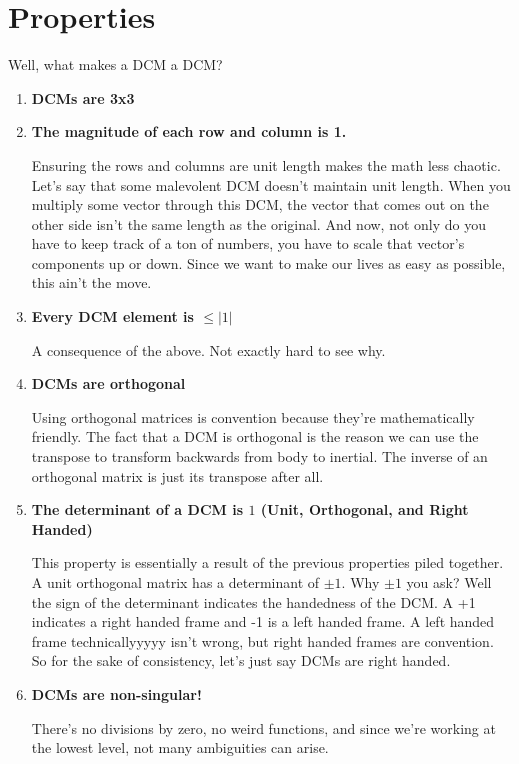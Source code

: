 \documentclass[a4paper,14pt]{extreport}
\begin{document}
\section{Properties}
Well, what makes a DCM a DCM?
\begin{enumerate}
\item{\textbf{DCMs are 3x3}}

\item{\textbf{The magnitude of each row and column is 1.}}

Ensuring the rows and columns are unit length makes the math less chaotic. Let's say that some malevolent DCM doesn't maintain unit length. When you multiply some vector through this DCM, the vector that comes out on the other side isn't the same length as the original. And now, not only do you have to keep track of a ton of numbers, you have to scale that vector's components up or down. Since we want to make our lives as easy as possible, this ain't the move.

\item{\textbf{Every DCM element is $\leq |1|$}}

A consequence of the above. Not exactly hard to see why.

\item{\textbf{DCMs are orthogonal}}

Using orthogonal matrices is convention because they're mathematically friendly. The fact that a DCM is orthogonal is the reason we can use the transpose to transform backwards from body to inertial. The inverse of an orthogonal matrix is just its transpose after all.

\item{\textbf{The determinant of a DCM is $1$ (Unit, Orthogonal, and Right Handed)}}

This property is essentially a result of the previous properties piled together. A unit orthogonal matrix has a determinant of $\pm 1$. Why $\pm 1$ you ask? Well the sign of the determinant indicates the handedness of the DCM. A +1 indicates a right handed frame and -1 is a left handed frame. A left handed frame technicallyyyyy isn't wrong, but right handed frames are convention. So for the sake of consistency, let's just say DCMs are right handed.

\item{\textbf{DCMs are non-singular!}}

There's no divisions by zero, no weird functions, and since we're working at the lowest level, not many ambiguities can arise.
\end{enumerate}
\end{document}
